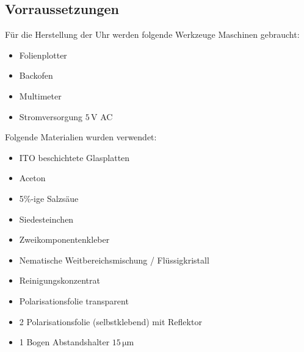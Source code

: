 \subsection{Vorraussetzungen}
Für die Herstellung der Uhr werden folgende Werkzeuge Maschinen gebraucht:
\begin{itemize}
\item Folienplotter
\item Backofen
\item Multimeter
\item Stromversorgung \(5\,\mathrm{V}\) AC

\end{itemize}
Folgende Materialien wurden verwendet:
\begin{itemize}
\item ITO beschichtete Glasplatten
\item Aceton
\item 5\%-ige Salzsäue
\item Siedesteinchen
\item Zweikomponentenkleber
\item Nematische Weitbereichsmischung / Flüssigkristall
\item Reinigungskonzentrat
\item Polarisationsfolie transparent
\item 2 Polarisationsfolie (selbstklebend) mit Reflektor
\item 1 Bogen Abstandshalter \(15\,\mathrm{\mu m}\)
\end{itemize}